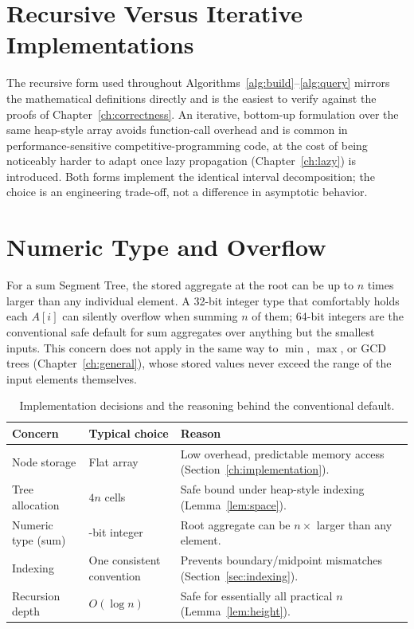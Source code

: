 \documentclass[
  11pt,
  a4paper,
  twoside=false,
  numbers=noenddot,
  headings=big,
  parskip=half,
  toc=bibliography,
  toc=listof,
  bibliography=totoc
]{scrreprt}
\newcounter{definition}[chapter]
\newcommand{\Oh}[1]{O\!\left(#1\right)}
\newcommand{\tblhead}[1]{\textbf{\sffamily #1}}
\begin{document}
\section{Recursive Versus Iterative Implementations}
The recursive form used throughout Algorithms~\ref{alg:build}--\ref{alg:query} mirrors the mathematical definitions directly and is the easiest to verify against the proofs of Chapter~\ref{ch:correctness}. An iterative, bottom-up formulation over the same heap-style array avoids function-call overhead and is common in performance-sensitive competitive-programming code, at the cost of being noticeably harder to adapt once lazy propagation (Chapter~\ref{ch:lazy}) is introduced. Both forms implement the identical interval decomposition; the choice is an engineering trade-off, not a difference in asymptotic behavior.

\section{Numeric Type and Overflow}
For a sum Segment Tree, the stored aggregate at the root can be up to $n$ times larger than any individual element. A 32-bit integer type that comfortably holds each $A[i]$ can silently overflow when summing $n$ of them; 64-bit integers are the conventional safe default for sum aggregates over anything but the smallest inputs. This concern does not apply in the same way to $\min$, $\max$, or GCD trees (Chapter~\ref{ch:general}), whose stored values never exceed the range of the input elements themselves.

\begin{table}[H]
\centering
\caption{Implementation decisions and the reasoning behind the conventional default.}
\label{tab:implementation}
\begin{tabular}{>{\raggedright\arraybackslash}p{3.6cm}>{\raggedright\arraybackslash}p{3.0cm}p{6.0cm}}
\toprule
\tblhead{Concern} & \tblhead{Typical choice} & \tblhead{Reason} \\
\midrule
Node storage & Flat array & Low overhead, predictable memory access (Section~\ref{ch:implementation}). \\
Tree allocation & $4n$ cells & Safe bound under heap-style indexing (Lemma~\ref{lem:space}). \\
Numeric type (sum) & 64-bit integer & Root aggregate can be $n\times$ larger than any element. \\
Indexing & One consistent convention & Prevents boundary/midpoint mismatches (Section~\ref{sec:indexing}). \\
Recursion depth & $\Oh{\log n}$ & Safe for essentially all practical $n$ (Lemma~\ref{lem:height}). \\
\bottomrule
\end{tabular}
\end{table}
\end{document}
